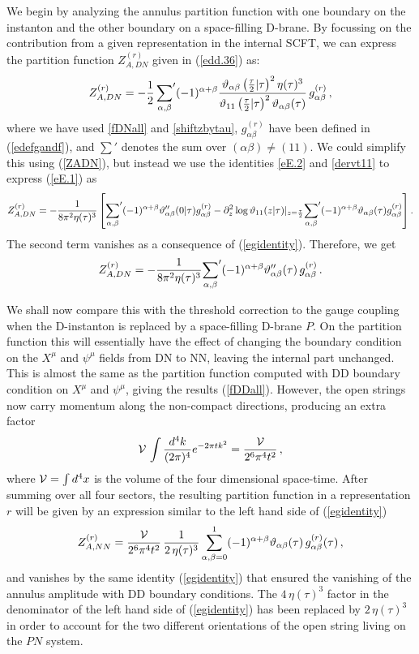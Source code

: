 \documentclass[12pt,a4paper]{article}
\newcommand{\be}{\begin{equation}}
\newcommand{\ee}{\end{equation}}
\newcommand{\refb}[1]{(\ref{#1})}
\newcommand{\p}{\partial}
\def\({\left(}
\def\){\right)}
\def\[{\left[}
\def\]{\right]}
\newcommand{\vt}{\vartheta}
\newcommand{\VV}{{\cal V}}
\def\gr{g^{(r)}}
\def\Zr{Z^{(r)}}
\begin{document}
We begin by analyzing the annulus partition function with one boundary on the instanton and
the other boundary on a space-filling D-brane.
By focussing on the contribution from a given representation in the internal SCFT, we can
express the partition function $\Zr_{A,DN}$ given in \refb{edd.36} as:
\be \label{eE.1}
\Zr_{A,DN}=-{1\over 2}\,
{\sum_{\alpha,\beta}}' (-1)^{\alpha+\beta} {\vt_{\alpha\beta}\({\tau\over 2}|\tau\)^2
\eta(\tau)^3\over \vt_{11}\({\tau\over 2}|\tau\)^2 \vt_{\alpha\beta}(\tau)} \,\gr_{\alpha\beta} \, ,
\ee
where we have used \eqref{fDNall} and \eqref{shiftzbytau},
$\gr_{\alpha\beta}$ have been defined in \refb{edefgandf}, and $\sum'$
denotes the sum over $(\alpha\beta)\ne (11)$. We could
simplify this using \refb{ZADN}, but instead we use
the identities \eqref{eE.2} and \eqref{dervt11} to express \refb{eE.1} as
\be
\Zr_{A,DN}=-{1\over 8\pi^2 \eta(\tau)^3} \[
{\sum_{\alpha,\beta}}' (-1)^{\alpha+\beta} \vt''_{\alpha\beta}(0|\tau) \gr_{\alpha\beta}
- \p_z^2 \log \vt_{11}(z|\tau)|_{z=\frac{\tau}{2}} {\sum_{\alpha,\beta}}' (-1)^{\alpha+\beta}
\vt_{\alpha\beta}(\tau) \gr_{\alpha\beta}\].
\ee
The second term vanishes as a consequence of \refb{egidentity}. Therefore, we get
\be\label{ecomp}
\Zr_{A,DN}=-{1\over 8\pi^2 \eta(\tau)^3}
{\sum_{\alpha,\beta}}' (-1)^{\alpha+\beta} \vt''_{\alpha\beta}(\tau)\, \gr_{\alpha\beta}\, .
\ee

We shall now compare this with the threshold correction to the gauge coupling when the
D-instanton is replaced by a space-filling D-brane $P$. On the partition function this will essentially
have the effect of changing the boundary condition on the $X^\mu$ and $\psi^\mu$ fields from DN to NN, leaving the
internal part unchanged. This is almost the same as
the partition function computed with DD boundary condition on $X^\mu$ and $\psi^\mu$,
giving the results \refb{fDDall}. However, the open strings now carry momentum
along the non-compact directions, producing an extra factor
\be\label{eE.6}
\VV\, \int {d^4 k\over (2\pi)^4} e^{-2\pi t k^2} =\frac{\VV}{2^{6}\pi^{4} t^{2}}\, ,
\ee
where $\VV = \int{d^4x} $ is the volume of the four dimensional
space-time. After summing over all four sectors, the resulting
partition function in a representation $r$ will be given by an expression similar to the left hand side
of \refb{egidentity}
\be \label{eidrep}
\Zr_{A,NN}=\frac{\VV}{2^{6}\pi^{4} t^{2}} \, \frac{1}{2\, \eta(\tau)^3}\sum_{\alpha,\beta=0}^1 (-1)^{\alpha+\beta}
\vt_{\alpha\beta}(\tau) \, \gr_{\alpha\beta}(\tau) \, ,
\ee
and vanishes by the same identity \refb{egidentity} that ensured
the vanishing of the annulus amplitude with DD boundary conditions. The $4\, \eta(\tau)^3$
factor in the denominator of the left hand side of \refb{egidentity}
has been replaced by $2\, \eta(\tau)^3$ in order to
account for the two different orientations of the open string living on the $PN$ system.
\end{document}
